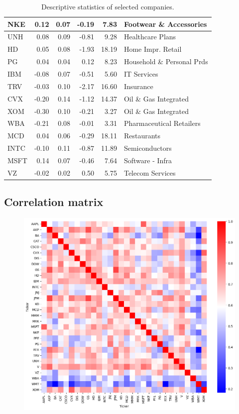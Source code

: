 \documentclass[a4paper,12pt]{article}
\begin{document}
\begin{table}[h!]
\begin{tabular}{|l|r|r|r|r|l|}
NKE  & 0.12  & 0.07 & -0.19 & 7.83  & Footwear \& Accessories         \\ \hline
UNH  & 0.08  & 0.09 & -0.81 & 9.28  & Healthcare Plans                \\ \hline
HD   & 0.05  & 0.08 & -1.93 & 18.19 & Home Impr. Retail         \\ \hline
PG   & 0.04  & 0.04 & 0.12  & 8.23  & Household \& Personal Prds  \\ \hline
IBM  & -0.08 & 0.07 & -0.51 & 5.60  & IT Services \\ \hline
TRV  & -0.03 & 0.10 & -2.17 & 16.60 & Insurance\\ \hline
CVX  & -0.20 & 0.14 & -1.12 & 14.37 & Oil \& Gas Integrated           \\ \hline
XOM  & -0.30 & 0.10 & -0.21 & 3.27  & Oil \& Gas Integrated           \\ \hline
WBA  & -0.21 & 0.08 & -0.01 & 3.31  & Pharmaceutical Retailers        \\ \hline
MCD  & 0.04  & 0.06 & -0.29 & 18.11 & Restaurants                     \\ \hline
INTC & -0.10 & 0.11 & -0.87 & 11.89 & Semiconductors                  \\ \hline
MSFT & 0.14  & 0.07 & -0.46 & 7.64  & Software - Infra       \\ \hline
VZ   & -0.02 & 0.02 & 0.50  & 5.75  & Telecom Services                \\ \hline
\end{tabular}
\caption{Descriptive statistics of selected companies.}
\label{tab:company_statistics}
\end{table}

\newpage
\subsection{Correlation matrix \label{corr}}
\begin{figure}[h!]
    \centering
    \includegraphics[width=1\textwidth]{resources/Correlation Matrix of DJ constituents.png}
\end{figure}
\end{document}
